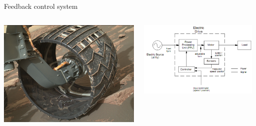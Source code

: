 \documentclass[presentation,aspectratio=169, usenames, dvipsnames]{beamer}
\begin{document}
\begin{frame}[label={sec:orgcf586fe}]{Feedback control system}
\begin{columns}
\begin{column}{0.4\columnwidth}
\begin{center}
 \includegraphics[width=1.0\linewidth]{../../figures/curiosity-wheel.jpg}
\end{center}
\end{column}

\begin{column}{0.6\columnwidth}
\pause

\begin{center}
\includegraphics[width=\linewidth]{../../figures/electric-drive-block.png}
\end{center}
\end{column}
\end{columns}
\end{frame}
\end{document}
